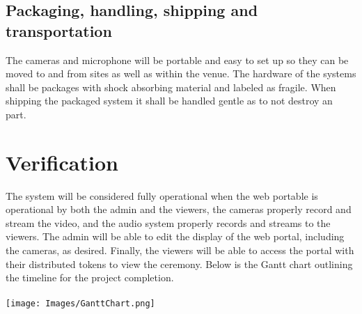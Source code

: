 \documentclass[onecolumn, draftclsnofoot,10pt, compsoc]{IEEEtran}
\begin{document}
    \subsection{Packaging, handling, shipping and transportation}
    The cameras and microphone will be portable and easy to set up so they can be moved to and from sites as well as within the venue. 
    The hardware of the systems shall be packages with shock absorbing material and labeled as fragile. 
    When shipping the packaged system it shall be handled gentle as to not destroy an part. 
    
\section{Verification}
The system will be considered fully operational when the web portable is operational by both the admin and the viewers, the cameras properly record and stream the video, and the audio system properly records and streams to the viewers.
The admin will be able to edit the display of the web portal, including the cameras, as desired.
Finally, the viewers will be able to access the portal with their distributed tokens to view the ceremony. 
Below is the Gantt chart outlining the timeline for the project completion.
\\
\\
\texttt{[image: Images/GanttChart.png]}

        
\end{document}
